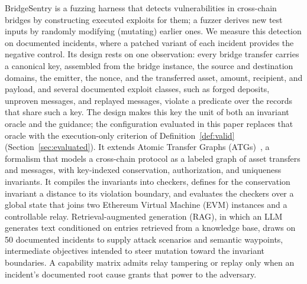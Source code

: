 \documentclass[a4paper]{cas-sc}
\begin{document}
BridgeSentry is a fuzzing harness that detects vulnerabilities in cross-chain bridges by constructing executed exploits for them; a fuzzer derives new test inputs by randomly modifying (mutating) earlier ones. We measure this detection on documented incidents, where a patched variant of each incident provides the negative control. Its design rests on one observation: every bridge transfer carries a canonical key, assembled from the bridge instance, the source and destination domains, the emitter, the nonce, and the transferred asset, amount, recipient, and payload, and several documented exploit classes, such as forged deposits, unproven messages, and replayed messages, violate a predicate over the records that share such a key. The design makes this key the unit of both an invariant oracle and the guidance; the configuration evaluated in this paper replaces that oracle with the execution-only criterion of Definition~\ref{def:valid} (Section~\ref{sec:evaluated}). It extends Atomic Transfer Graphs (ATGs)~\citep{dubler2025atg}, a formalism that models a cross-chain protocol as a labeled graph of asset transfers and messages, with key-indexed conservation, authorization, and uniqueness invariants. It compiles the invariants into checkers, defines for the conservation invariant a distance to its violation boundary, and evaluates the checkers over a global state that joins two Ethereum Virtual Machine (EVM) instances and a controllable relay. Retrieval-augmented generation (RAG), in which an LLM generates text conditioned on entries retrieved from a knowledge base, draws on 50 documented incidents to supply attack scenarios and semantic waypoints, intermediate objectives intended to steer mutation toward the invariant boundaries. A capability matrix admits relay tampering or replay only when an incident's documented root cause grants that power to the adversary.
\end{document}
